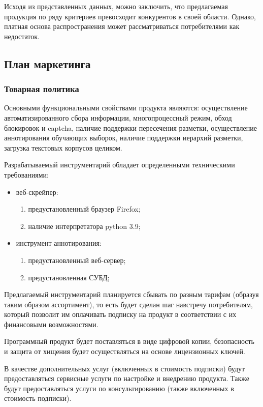 \documentclass[../main]{subfiles}
\begin{document}
Исходя из представленных данных, можно заключить, что предлагаемая продукция по ряду критериев превосходит конкурентов в своей области. Однако, платная основа распространения может рассматриваться потребителями как недостаток.

\subsection{План маркетинга}

\subsubsection{Товарная политика}
Основными функциональными свойствами продукта являются: осуществление автоматизированного сбора информации, многопроцессный режим, обход блокировок и captcha, наличие поддержки пересечения разметки, осуществление аннотирования обучающих выборок, наличие поддержки иерархий разметки, загрузка текстовых корпусов целиком.

Разрабатываемый инструментарий обладает определенными техническими требованиями:
\begin{itemize}
    \item веб-скрейпер:
    \begin{enumerate}
        \item предустановленный браузер Firefox;
        \item наличие интерпретатора python 3.9;
    \end{enumerate}
    \item инструмент аннотирования:
    \begin{enumerate}
        \item предустановленный веб-сервер;
        \item предустановленная СУБД;
    \end{enumerate}
\end{itemize}

Предлагаемый инструментарий планируется сбывать по разным тарифам (образуя таким образом ассортимент), то есть будет сделан шаг навстречу потребителям, который позволит им оплачивать подписку на продукт в соответствии с их финансовыми возможностями.

Программный продукт будет поставляться в виде цифровой копии, безопасность и защита от хищения будет осуществляться на основе лицензионных ключей.

В качестве дополнительных услуг (включенных в стоимость подписки) будут предоставляться сервисные услуги по настройке и внедрению продукта. Также будут предоставляться услуги по консультированию (также включенных в стоимость подписки).
\end{document}

